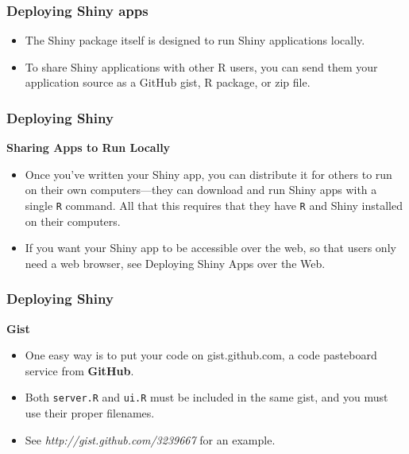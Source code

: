 \documentclass{beamer}
\begin{document}
\begin{frame}
\frametitle{Deploying Shiny apps}
\Large
\vspace{-1cm}
\begin{itemize}
\item  The Shiny package itself is designed to run Shiny applications locally. 
\item To share Shiny applications with other R users, you can send them your application source as a GitHub gist, R package, or zip file.
\end{itemize}
\end{frame}

\begin{frame}
\frametitle{Deploying Shiny}
\Large
\textbf{Sharing Apps to Run Locally}
\begin{itemize}
\item Once you’ve written your Shiny app, you can distribute it for others to run on their own computers—they can download and run Shiny apps with a single \texttt{R} command. All that this requires that they have \texttt{R} and Shiny installed on their computers.

\item If you want your Shiny app to be accessible over the web, so that users only need a web browser, see Deploying Shiny Apps over the Web.
\end{itemize}

\end{frame}
\begin{frame}
\frametitle{Deploying Shiny}
\Large
\textbf{Gist}
\begin{itemize}
\item One easy way is to put your code on gist.github.com, a code pasteboard service from \textbf{GitHub}. 
\item Both \texttt{server.R} and \texttt{ui.R} must be included in the same gist, and you must use their proper filenames. 
\item See \textit{http://gist.github.com/3239667} for an example.
\end{itemize}
\end{frame}
\end{document}
